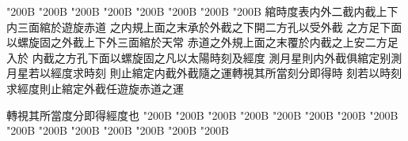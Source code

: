 \begin{正文}
\char"200B\relax{}
\char"200B\relax{}
\char"200B\relax{}
\char"200B\relax{}
\char"200B\relax{}
\char"200B\relax{}
\char"200B\relax{}
\char"200B\relax{}
綰時度表内外二截内截上下内三面綰於遊旋赤道
之内規上面之末承於外截之下開二方孔以受外截
之方足下面以螺旋固之外截上下外三面綰於天常
赤道之外規上面之末覆於内截之上安二方足入於
内截之方孔下面以螺旋固之凡以太陽時刻及經度
測月星則内外截俱綰定别測月星若以經度求時刻
則止綰定内截外截隨之運轉視其所當刻分即得時
刻若以時刻求經度則止綰定外截任遊旋赤道之運
\par
轉視其所當度分即得經度也
\char"200B\relax{}
\char"200B\relax{}
\char"200B\relax{}
\char"200B\relax{}
\char"200B\relax{}
\char"200B\relax{}
\char"200B\relax{}
\char"200B\relax{}
\char"200B\relax{}
\char"200B\relax{}
\char"200B\relax{}
\char"200B\relax{}
\char"200B\relax{}
\char"200B\relax{}
\char"200B\relax
\par
\end{正文}\clearpage
{}
